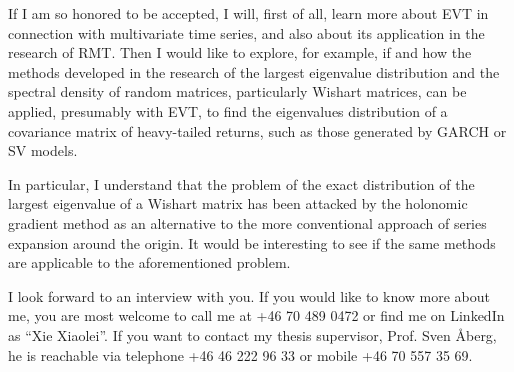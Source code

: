 \documentclass[10pt,stdletter,dateno,sigleft]{newlfm} %
\begin{document}
\begin{newlfm}
If I am so honored to be accepted, I will, first of all, learn more
about EVT in connection with multivariate time 
series, and also about its application in the research of RMT. Then I
would like to explore, for example, if and how the methods developed in the
research of the largest eigenvalue distribution and the spectral
density of random matrices, particularly Wishart matrices, can
be applied, presumably with EVT, to find the eigenvalues distribution
of a covariance matrix of heavy-tailed returns, such as those generated
by GARCH or SV models.

In particular, I understand that the problem of the exact
distribution of the largest eigenvalue of a Wishart matrix has been
attacked by the holonomic gradient method as an alternative to the
more conventional approach of series expansion around the origin. It
would be interesting to see if the same methods are applicable to the
aforementioned problem.

I look forward to an interview with you. If you would like to know more
about me, you are most welcome to call me at +46 70 489 0472 or find
me on LinkedIn as ``Xie Xiaolei''. If you want to contact my thesis
supervisor, Prof. Sven \AA berg, he is reachable via telephone +46 46
222 96 33 or mobile +46 70 557 35 69.

\end{newlfm}
\end{document}
